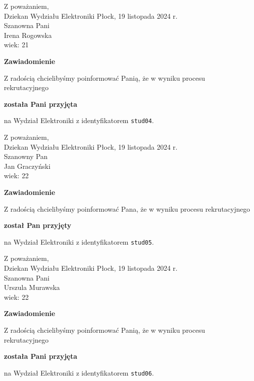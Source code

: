 \documentclass[12pt,a4paper]{article}
\begin{document}
\noindent
Z poważaniem,\\
Dziekan
Wydziału Elektroniki
\newpage
\hfill Płock, 19 listopada 2024 r.\\ 
\noindent 
Szanowna Pani \\
Irena Rogowska \\
wiek: 21

\bigskip

\begin{center}
{\Large\textbf{Zawiadomienie}}
\end{center}
\bigskip
Z radością chcielibyśmy poinformować Panią, że w wyniku procesu rekrutacyjnego
\begin{center}
\textsf{\textbf{została Pani przyjęta}} 
\end{center}
na Wydział Elektroniki z identyfikatorem \verb|stud04|.
\vspace{2cm}

\noindent
Z poważaniem,\\
Dziekan
Wydziału Elektroniki
\newpage
\hfill Płock, 19 listopada 2024 r.\\ 
\noindent 
Szanowny Pan \\
Jan Graczyński  \\
wiek: 22

\bigskip

\begin{center}
{\Large\textbf{Zawiadomienie}}
\end{center}
\bigskip
Z radością chcielibyśmy poinformować Pana, że w wyniku procesu rekrutacyjnego
\begin{center}
\textsf{\textbf{został Pan przyjęty}} 
\end{center}
na Wydział Elektroniki z identyfikatorem \verb|stud05|.
\vspace{2cm}

\noindent
Z poważaniem,\\
Dziekan
Wydziału Elektroniki
\newpage
\hfill Płock, 19 listopada 2024 r.\\ 
\noindent 
Szanowna Pani \\
Urszula Murawska  \\
wiek: 22

\bigskip

\begin{center}
{\Large\textbf{Zawiadomienie}}
\end{center}
\bigskip
Z radością chcielibyśmy poinformować Panią, że w wyniku procesu rekrutacyjnego
\begin{center}
\textsf{\textbf{została Pani przyjęta}} 
\end{center}
na Wydział Elektroniki z identyfikatorem \verb|stud06|.
\vspace{2cm}
\end{document}

